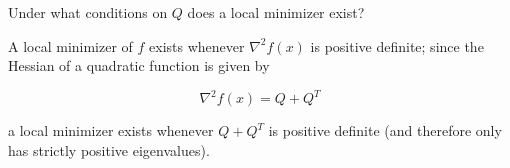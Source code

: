 Under what conditions on $Q$ does a local minimizer exist?

\begin{solution}
    A local minimizer of $f$ exists whenever $\nabla^2 f(x)$ is positive definite; since the Hessian of a quadratic
    function is given by

    $$
    \nabla^2 f(x) = Q + Q^T
    $$

    a local minimizer exists whenever $Q + Q^T$ is positive definite (and therefore only has strictly positive 
    eigenvalues).
    \ \\
\end{solution}